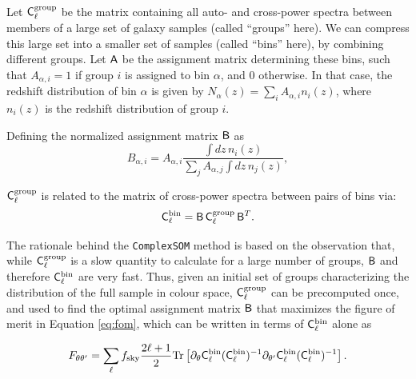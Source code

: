 \documentclass[twocolumn,twocolappendix]{aastex63}
\begin{document}
Let ${\sf C}^{\rm group}_\ell$ be the matrix containing all auto- and
cross-power spectra between members of a large set of galaxy samples (called
``groups'' here). We can compress this large set into a smaller set of samples
(called ``bins'' here), by combining different groups. Let ${\sf A}$ be the
assignment matrix determining these bins, such that $A_{\alpha,i}=1$ if group
$i$ is assigned to bin $\alpha$, and 0 otherwise. In that case, the redshift
distribution of bin $\alpha$ is given by $N_\alpha(z)=\sum_i
A_{\alpha,i}n_i(z)$, where $n_i(z)$ is the redshift distribution of group $i$.

Defining the normalized assignment matrix ${\sf B}$ as
\begin{equation}
B_{\alpha,i}=A_{\alpha,i}\frac{\int dz\,n_i(z)}{\sum_j A_{\alpha,j}\int dz\,n_j(z)},
\end{equation}

${\sf C}^{\rm group}_\ell$ is related to the matrix of cross-power spectra
between pairs of bins via:
\begin{equation}
{\sf C}^{\rm bin}_\ell={\sf B}\,{\sf C}^{\rm group}_\ell\,{\sf B}^T.
\end{equation}

The rationale behind the {\tt ComplexSOM} method is based on the observation
that, while ${\sf C}^{\rm group}_\ell$ is a slow quantity to calculate for a
large number of groups, ${\sf B}$ and therefore ${\sf C}^{\rm bin}_\ell$ are
very fast. Thus, given an initial set of groups characterizing the
distribution of the full sample in colour space, ${\sf C}^{\rm group}_\ell$
can be precomputed once, and used to find the optimal assignment matrix ${\sf
B}$ that maximizes the figure of merit in Equation \ref{eq:fom},
which can be written in terms of ${\sf C}^{\rm bin}_\ell$ alone as

\begin{equation}\label{eq:fom_tr}
F_{\theta\theta'}=\sum_\ell f_{\rm sky}\frac{2\ell+1}{2}{\rm Tr}\left[\partial_\theta{\sf C}^{\rm bin}_\ell({\sf C}^{\rm bin}_\ell)^{-1}\partial_{\theta'}{\sf C}^{\rm bin}_\ell({\sf C}_\ell^{\rm bin})^{-1}\right].
\end{equation}
\end{document}
